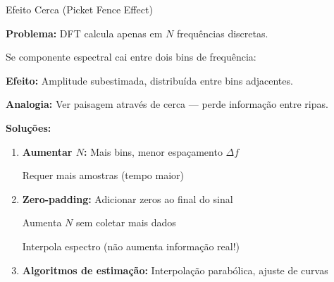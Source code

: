 \begin{frame}{Efeito Cerca (Picket Fence Effect)}

\textbf{Problema:} DFT calcula apenas em $N$ frequências discretas.

Se componente espectral cai entre dois bins de frequência:

\textbf{Efeito:} Amplitude subestimada, distribuída entre bins adjacentes.

\vspace{0.1cm}

\textbf{Analogia:} Ver paisagem através de cerca — perde informação entre ripas.

\vspace{0.1cm}

\textbf{Soluções:}

\begin{enumerate}
\item \textbf{Aumentar $N$:} Mais bins, menor espaçamento $\Delta f$
   
   Requer mais amostras (tempo maior)

\item \textbf{Zero-padding:} Adicionar zeros ao final do sinal
   
   Aumenta $N$ sem coletar mais dados
   
   Interpola espectro (não aumenta informação real!)

\item \textbf{Algoritmos de estimação:} Interpolação parabólica, ajuste de curvas
\end{enumerate}

\end{frame}


